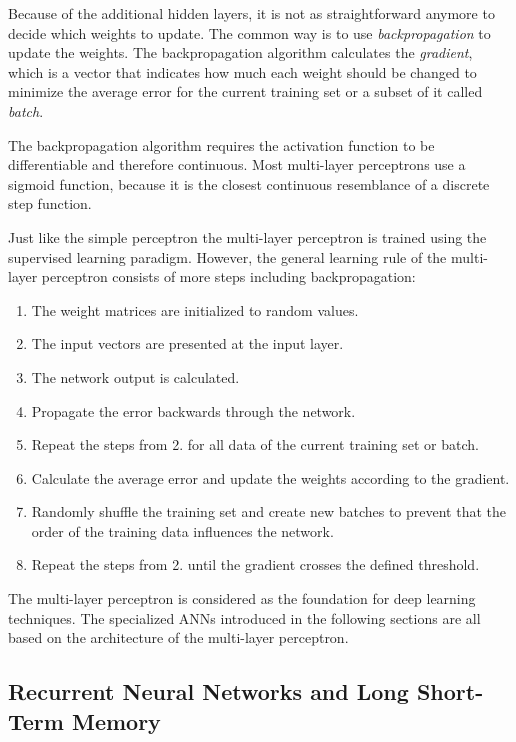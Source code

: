 Because of the additional hidden layers, it is not as straightforward anymore to decide which weights to update. The common way is to use \textit{backpropagation} to update the weights. The backpropagation algorithm calculates the \textit{gradient}, which is a vector that indicates how much each weight should be changed to minimize the average error for the current training set or a subset of it called \textit{batch}.
\cite{nielsen2015neural,hochreiter2001gradient}

The backpropagation algorithm requires the activation function to be differentiable and therefore continuous. Most multi-layer perceptrons use a sigmoid function, because it is the closest continuous resemblance of a discrete step function.
\cite{haykin2009neural,nielsen2015neural}

Just like the simple perceptron the multi-layer perceptron is trained using the supervised learning paradigm. However, the general learning rule of the multi-layer perceptron consists of more steps including backpropagation:

\begin{enumerate}
    \item The weight matrices are initialized to random values.
    \item The input vectors are presented at the input layer.
    \item The network output is calculated.
    \item Propagate the error backwards through the network.
    \item Repeat the steps from 2. for all data of the current training set or batch.
    \item Calculate the average error and update the weights according to the gradient.
    \item Randomly shuffle the training set and create new batches to prevent that the order of the training data influences the network.
    \item Repeat the steps from 2. until the gradient crosses the defined threshold.
    \cite{nielsen2015neural}
    
\end{enumerate}

The multi-layer perceptron is considered as the foundation for deep learning techniques. The specialized \acp{ANN} introduced in the following sections are all based on the architecture of the multi-layer perceptron.
\cite{nielsen2015neural}

\subsection{Recurrent Neural Networks and Long Short-Term Memory}

